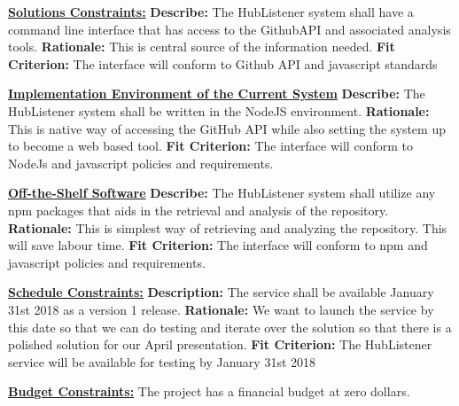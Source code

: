 \documentclass{article}
\begin{document}
\noindent
\textbf{\underline{Solutions Constraints:}}\newline
\textbf{Describe:} The HubListener system shall have a command line interface that has access to the GithubAPI and associated analysis tools.\newline
\textbf{Rationale:} This is central source of the information needed. \newline
\textbf{Fit Criterion:} The interface will conform to Github API and javascript standards \newline

\noindent
\textbf{\underline{Implementation Environment of the Current System}}\newline
\textbf{Describe:} The HubListener system shall be written in the NodeJS environment.\newline
\textbf{Rationale:} This is native way of accessing the GitHub API while also setting the system up to become a web based tool.\newline 
\textbf{Fit Criterion:} The interface will conform to NodeJs and javascript policies and requirements. \newline

\noindent
\textbf{\underline{Off-the-Shelf Software}}\newline
\textbf{Describe:} The HubListener system shall utilize any npm packages that aids in the retrieval and analysis of the repository. \newline
\textbf{Rationale:} This is simplest way of retrieving and analyzing the repository. This will save labour time.\newline
\textbf{Fit Criterion:} The interface will conform to npm and javascript policies and requirements. \newline

\noindent
\textbf{\underline{Schedule Constraints:}}\newline
\textbf{Description:} The service shall be available January 31st 2018 as a version 1 release.\newline
\textbf{Rationale:} We want to launch the service by this date so that we can do testing and iterate over the solution so that there is a polished solution for our April presentation.\newline
\textbf{Fit Criterion:} The HubListener service will be available for testing by January 31st 2018 \newline

\noindent
\textbf{\underline{Budget Constraints:}} 
The project has a financial budget at zero dollars. 
\newpage
\end{document}
